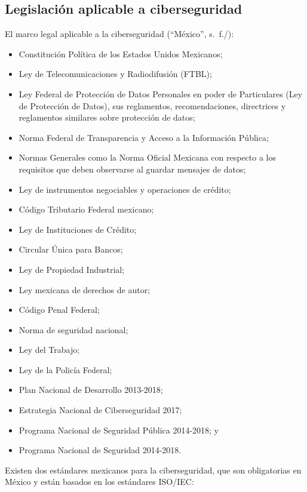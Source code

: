 \documentclass[
  12,
]{scrartcl}
\providecommand{\tightlist}{%
  \setlength{\itemsep}{0pt}\setlength{\parskip}{0pt}}
\begin{document}
\hypertarget{legislaciuxf3n-aplicable-a-ciberseguridad}{%
\subsection{Legislación aplicable a
ciberseguridad}\label{legislaciuxf3n-aplicable-a-ciberseguridad}}

El marco legal aplicable a la ciberseguridad ({``México''}, s.~f./):

\begin{itemize}
\tightlist
\item
  Constitución Política de los Estados Unidos Mexicanos;
\item
  Ley de Telecomunicaciones y Radiodifusión (FTBL);
\item
  Ley Federal de Protección de Datos Personales en poder de Particulares
  (Ley de Protección de Datos), sus reglamentos, recomendaciones,
  directrices y reglamentos similares sobre protección de datos;
\item
  Norma Federal de Transparencia y Acceso a la Información Pública;
\item
  Normas Generales como la Norma Oficial Mexicana con respecto a los
  requisitos que deben observarse al guardar mensajes de datos;
\item
  Ley de instrumentos negociables y operaciones de crédito;
\item
  Código Tributario Federal mexicano;
\item
  Ley de Instituciones de Crédito;
\item
  Circular Única para Bancos;
\item
  Ley de Propiedad Industrial;
\item
  Ley mexicana de derechos de autor;
\item
  Código Penal Federal;
\item
  Norma de seguridad nacional;
\item
  Ley del Trabajo;
\item
  Ley de la Policía Federal;
\item
  Plan Nacional de Desarrollo 2013-2018;
\item
  Estrategia Nacional de Ciberseguridad 2017;
\item
  Programa Nacional de Seguridad Pública 2014-2018; y
\item
  Programa Nacional de Seguridad 2014-2018.
\end{itemize}

Existen dos estándares mexicanos para la ciberseguridad, que son
obligatorias en México y están basados en los estándares ISO/IEC:
\end{document}
